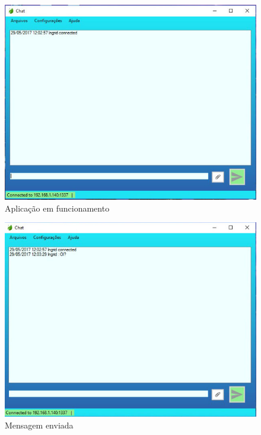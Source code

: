 \begin{figure}[!htb]
	\centering
	\includegraphics[scale=0.4]{img/t-rodando.jpeg}
	\caption{Aplicação em funcionamento}
	\label{Aplicação em funcionamento}
\end{figure}

\begin{figure}[!htb]
	\centering
	\includegraphics[scale=0.4]{img/t-msg-enviada.jpeg}
	\caption{Mensagem enviada}
	\label{Mensagem enviada}
\end{figure}

